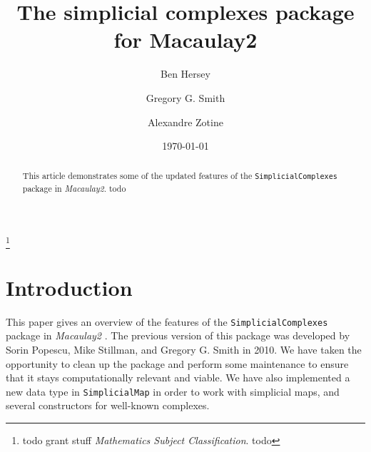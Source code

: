 \documentclass[12pt,leqno]{amsart}
\theoremstyle{definition}
\begin{document}
\title[Simplicial Complexes]{The simplicial complexes package for Macaulay2}
\author[B.~Hersey]{Ben Hersey}
\address{Ben Hersey: Department of Mathematics and Statistics, Queen's University, Kingston, Ontario, K7L 3N6;
  {\normalfont \texttt{b.hersey@queensu.ca}}}

\author[G.G.~Smith]{Gregory G.{} Smith}
\address{Gregory G.{} Smith: Department of Mathematics and Statistics, Queen's
  University, Kingston, Ontario, K7L 3N6, Canada; {\normalfont
    \texttt{ggsmith@mast.queensu.ca}}}

\author[A.~Zotine]{Alexandre Zotine}
\address{Alexandre Zotine: Department of Mathematics and Statistics, Queen's University, Kingston, Ontario, K7L 3N6;
  {\normalfont \texttt{18az45@queensu.ca}}}

\thanks{todo grant stuff \emph{Mathematics Subject Classification}. todo}
\date{\today}

\begin{abstract}
  This article demonstrates some of the updated features of the \texttt{SimplicialComplexes} package in \emph{Macaulay2}. todo
\end{abstract}

\maketitle


\addtocounter{lemma}{-1}

\section{Introduction}
\label{S:Introduction}

This paper gives an overview of the features of the \texttt{SimplicialComplexes} package in \emph{Macaulay2} \cite{M2}. The previous version of this package was developed by Sorin Popescu, Mike Stillman, and Gregory G. Smith in 2010. We have taken the opportunity to clean up the package and perform some maintenance to ensure that it stays computationally relevant and viable. We have also implemented a new data type in \texttt{SimplicialMap} in order to work with simplicial maps, and several constructors for well-known complexes.
\end{document}
